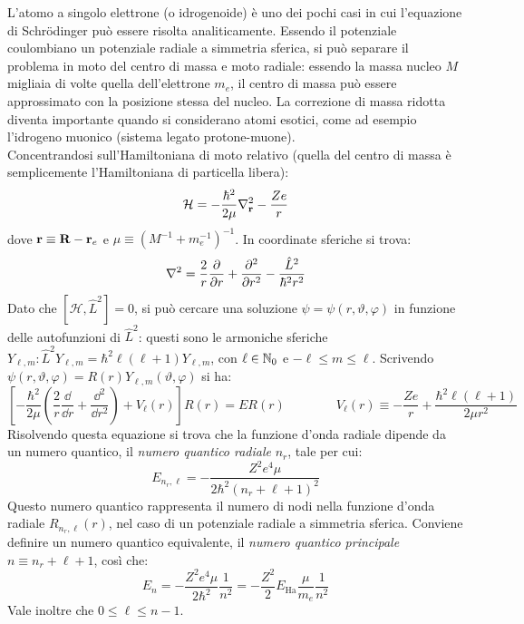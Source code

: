 L'atomo a singolo elettrone (o idrogenoide) è uno dei pochi casi in cui l'equazione di Schrödinger può essere risolta analiticamente. Essendo il potenziale coulombiano un potenziale radiale a simmetria sferica, si può separare il problema in moto del centro di massa e moto radiale: essendo la massa nucleo $ M $ migliaia di volte quella dell'elettrone $ m_e $, il centro di massa può essere approssimato con la posizione stessa del nucleo. La correzione di massa ridotta diventa importante quando si considerano atomi esotici, come ad esempio l'idrogeno muonico (sistema legato protone-muone).\\
Concentrandosi sull'Hamiltoniana di moto relativo (quella del centro di massa è semplicemente l'Hamiltoniana di particella libera):
\begin{equation}
	\mathcal{H} = - \frac{\hbar^2}{2\mu} \nabla_{\mathbf{r}}^2 - \frac{Ze}{r}
	\label{eq:1.2}
\end{equation}
dove $ \mathbf{r} \equiv \mathbf{R} - \mathbf{r}_e $ e $ \mu \equiv (M^{-1} + m_e^{-1})^{-1} $. In coordinate sferiche si trova:
\begin{equation*}
	\nabla^2 = \frac{2}{r} \frac{\partial}{\partial r} + \frac{\partial^2}{\partial r^2} - \frac{\hat{L}^2}{\hbar^2 r^2}
\end{equation*}
Dato che $ [\mathcal{H} , \hat{L}^2] = 0 $, si può cercare una soluzione $ \psi = \psi(r,\vartheta,\varphi) $ in funzione delle autofunzioni di $ \hat{L}^2 $: questi sono le armoniche sferiche $ Y_{\ell,m} : \hat{L}^2 Y_{\ell,m} = \hbar^2 \ell (\ell + 1) Y_{\ell,m} $, con $ \ell \in \mathbb{N}_0 $ e $ -\ell \le m \le \ell $. Scrivendo $ \psi(r,\vartheta,\varphi) = R(r) Y_{\ell,m}(\vartheta,\varphi) $ si ha:
\begin{equation*}
	\left[ - \frac{\hbar^2}{2\mu} \left( \frac{2}{r} \frac{\dd}{\dd r} + \frac{\dd^2}{\dd r^2} \right) + V_\ell(r) \right] R(r) = E R(r)
	\qquad \qquad
	V_\ell(r) \equiv - \frac{Ze}{r} + \frac{\hbar^2 \ell(\ell + 1)}{2\mu r^2}
\end{equation*}
Risolvendo questa equazione si trova che la funzione d'onda radiale dipende da un numero quantico, il \textit{numero quantico radiale} $ n_r $, tale per cui:
\begin{equation*}
	E_{n_r,\ell} = - \frac{Z^2 e^4 \mu}{2\hbar^2 (n_r + \ell + 1)^2}
\end{equation*}
Questo numero quantico rappresenta il numero di nodi nella funzione d'onda radiale $ R_{n_r,\ell}(r) $, nel caso di un potenziale radiale a simmetria sferica. Conviene definire un numero quantico equivalente, il \textit{numero quantico principale} $ n \equiv n_r + \ell + 1 $, così che:
\begin{equation}
	E_n = - \frac{Z^2 e^4 \mu}{2\hbar^2} \frac{1}{n^2} = - \frac{Z^2}{2} E_\text{Ha} \frac{\mu}{m_e} \frac{1}{n^2}
	\label{eq:1.3}
\end{equation}
Vale inoltre che $ 0 \le \ell \le n-1 $.

